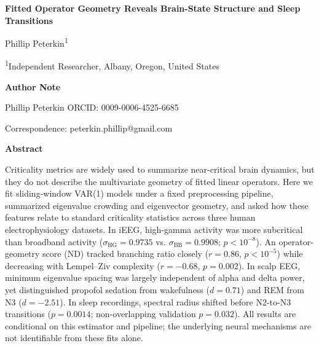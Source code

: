 \documentclass[preprint,12pt,nonatbib]{elsarticle}
\begin{document}
\begin{center}
{\Large\bfseries Fitted Operator Geometry Reveals Brain-State Structure and Sleep Transitions\par}
\vspace{6pt}
{\normalsize Phillip Peterkin\textsuperscript{1}\par}
\vspace{3pt}
{\footnotesize \textsuperscript{1}Independent Researcher, Albany, Oregon, United States\par}
\end{center}

\vspace{6pt}
\begin{center}
{\normalsize\bfseries Author Note\par}
\vspace{3pt}
{\footnotesize Phillip Peterkin ORCID: 0009-0006-4525-6685\par}
{\footnotesize Correspondence: peterkin.phillip@gmail.com\par}
\end{center}

\vspace{6pt}
\begin{center}
{\normalsize\bfseries Abstract\par}
\end{center}

\begin{center}
\begin{minipage}{0.86\textwidth}
\footnotesize
Criticality metrics are widely used to summarize near-critical brain dynamics, but they do not describe the multivariate geometry of fitted linear operators. Here we fit sliding-window VAR(1) models under a fixed preprocessing pipeline, summarized eigenvalue crowding and eigenvector geometry, and asked how these features relate to standard criticality statistics across three human electrophysiology datasets. In iEEG, high-gamma activity was more subcritical than broadband activity ($\sigma_{\mathrm{HG}} = 0.9735$ vs. $\sigma_{\mathrm{BB}} = 0.9908$; $p < 10^{-8}$). An operator-geometry score (ND) tracked branching ratio closely ($r = 0.86$, $p < 10^{-5}$) while decreasing with Lempel--Ziv complexity ($r = -0.68$, $p = 0.002$). In scalp EEG, minimum eigenvalue spacing was largely independent of alpha and delta power, yet distinguished propofol sedation from wakefulness ($d = 0.71$) and REM from N3 ($d = -2.51$). In sleep recordings, spectral radius shifted before N2-to-N3 transitions ($p = 0.0014$; non-overlapping validation $p = 0.032$). All results are conditional on this estimator and pipeline; the underlying neural mechanisms are not identifiable from these fits alone.
\end{minipage}
\end{center}
\end{document}
